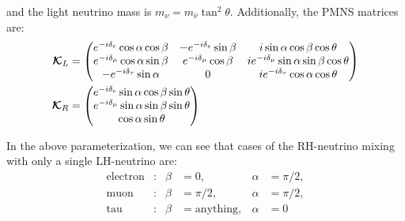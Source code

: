 \documentclass[a4paper,11pt]{article} \pdfoutput=1
\newcommand{\rhn}{\bar{\nu}}
\newcommand{\cK}{\mathcal{K}}
\begin{document}
and the light neutrino mass is \(m_{\nu} = m_{\rhn}\tan^2\theta\). Additionally, the
PMNS matrices are:
\begin{align}
	\bm{\cK}_{L}
	                                      &
	=
	\mqty(
	e^{-i\delta_{e}}\cos\alpha\cos\beta   &
	-e^{-i\delta_{e}}\sin\beta            &
	i \sin\alpha\cos\beta\cos\theta                   \\
	e^{-i\delta_{\mu}}\cos\alpha\sin\beta &
	e^{-i\delta_{\mu}}\cos\beta           &
	i e^{-i\delta_{\mu}}\sin\alpha\sin\beta\cos\theta \\
	-e^{-i\delta_{\tau}}\sin\alpha        &
	0                                     &
	i e^{-i\delta_{\tau}}\cos\alpha\cos\theta
	)                                                 \\
	\bm{\cK}_{R}
	                                      &
	=
	\mqty(
	e^{-i\delta_{e}}\sin\alpha\cos\beta\sin\theta     \\
	e^{-i\delta_{\mu}}\sin\alpha\sin\beta\sin\theta   \\
	\cos\alpha\sin\theta                              \\
	)
\end{align}




In the above parameterization, we can see that cases of the RH-neutrino mixing with only
a single LH-neutrino are:
\begin{align}
	\text{electron} & : & \beta & =0,                 & \alpha & =\pi/2, \\
	\text{muon}     & : & \beta & =\pi/2,             & \alpha & =\pi/2, \\
	\text{tau}      & : & \beta & =\mathrm{anything}, & \alpha & =0
\end{align}
\end{document}
